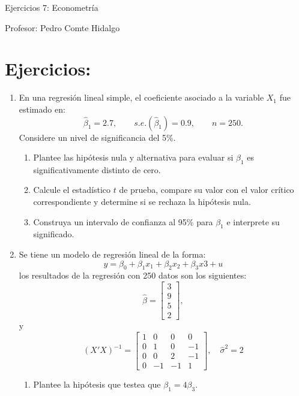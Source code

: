 \documentclass[10pt,a4paper]{article}
\begin{document}
\vspace{5cm}

\begin{center}
    {\Large  Ejercicios 7: Econometría }

Profesor:    Pedro Comte Hidalgo
\end{center}



\section{Ejercicios:}

\begin{enumerate}
    \item  En una regresión lineal simple, el coeficiente asociado a la variable
        \(X_1\) fue estimado en:
        \[
          \hat\beta_1 = 2.7,
          \qquad s.e.(\hat\beta_1) = 0.9,
          \qquad n = 250.
        \]
        Considere un nivel de significancia del 5\%.

        \begin{enumerate}[label=\alph*)]
          \item Plantee las hipótesis nula y alternativa para evaluar si
                \( \beta_1 \) es significativamente distinto de cero.
          \item  Calcule el estadístico \( t \) de prueba, compare su valor
                con el valor crítico correspondiente y determine si se
                rechaza la hipótesis nula.
          \item Construya un intervalo de confianza al 95\% para
                \( \beta_1 \) e interprete su significado.
        \end{enumerate}


\item  Se tiene un modelo de regresión lineal de la forma:
$$y=\beta_0 + \beta_1 x_1+\beta_2x_2+\beta_3 x3 + u$$
los resultados de la regresión con 250 datos son los siguientes:
        \[
          \hat{\beta} = \begin{bmatrix} 3 \\ 9 \\ 5 \\2 \end{bmatrix},
        \]
y 
        \[
          (X'X)^{-1} =
          \begin{bmatrix}
1 & 0  & 0  &  0\\
0 & 1  & 0  & -1\\
0 & 0  & 2  & -1\\
0 & -1 & -1 &  1
\end{bmatrix},
          \quad \hat{\sigma}^2 = 2
        \]
\begin{enumerate}
    \item  Plantee la hipótesis que testea que $\beta_1=4\beta_3$.


\end{enumerate}
\end{enumerate}
\end{document}
